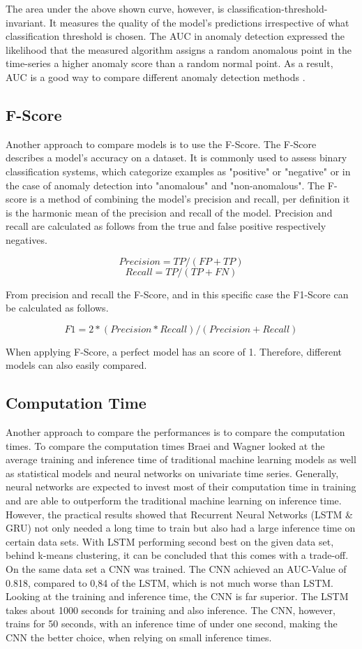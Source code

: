 The area under the above shown curve, however, is classification-threshold-invariant. It measures the quality of the model's predictions irrespective of what classification threshold is chosen. The AUC in anomaly detection expressed the likelihood that the measured algorithm assigns a random anomalous point in the time-series a higher anomaly score than a random normal point. As a result, AUC is a good way to compare different anomaly detection methods \parencite{Braei2020}.

\subsection{F-Score}
Another approach to compare models is to use the F-Score. The F-Score describes a model's accuracy on a dataset. It is commonly used to assess binary classification systems, which categorize examples as "positive" or "negative" or in the case of anomaly detection into "anomalous" and "non-anomalous". The F-score is a method of combining the model's precision and recall, per definition it is the harmonic mean of the precision and recall of the model. Precision and recall are calculated as follows from the true and false positive respectively negatives.

\[Precision = TP/(FP+TP)\]
\[Recall = TP/(TP+FN)\]

From precision and recall the F-Score, and in this specific case the F1-Score can be calculated as follows.

\[F1 = 2*(Precision*Recall)/(Precision+Recall)\]

When applying F-Score, a perfect model has an score of 1. Therefore, different models can also easily compared. 


\subsection{Computation Time}
Another approach to compare the performances is to compare the computation times. To compare the computation times Braei and Wagner \parencite*{Braei2020} looked at the average training and inference time of traditional machine learning models as well as  statistical models and neural networks on univariate time series. Generally, neural networks are expected to invest most of their computation time in training and are able to outperform the traditional machine learning on inference time. However, the practical results showed that Recurrent Neural Networks (LSTM \& GRU) not only needed a long time to train but also had a large inference time on certain data sets. With LSTM performing second best on the given data set, behind k-means clustering, it can be concluded that this comes with a trade-off. On the same data set a CNN was trained. The CNN achieved an AUC-Value of 0.818, compared to 0,84 of the LSTM, which is not much worse than LSTM. Looking at the training and inference time, the CNN is far superior. The LSTM takes about 1000 seconds for training and also inference. The CNN, however, trains for 50 seconds, with an inference time of under one second, making the CNN the better choice, when relying on small inference times.

